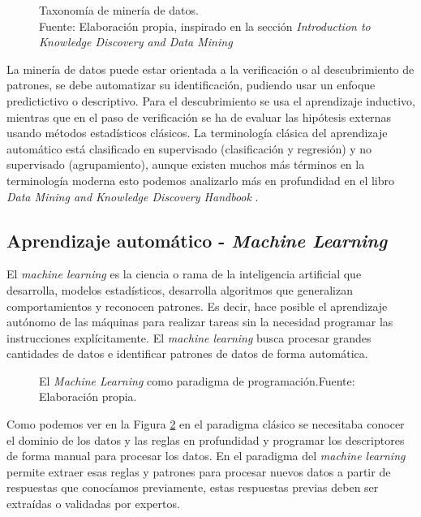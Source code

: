 \begin{figure}[H]
    \centering
    \centerline{}
    \caption{Taxonomía de minería de datos.\\Fuente: Elaboración propia, inspirado en la sección \textit{Introduction to Knowledge Discovery and Data Mining} \cite{maimon2005data}}
    \label{fig:data-mining-taxonomy}
\end{figure}

La minería de datos puede estar orientada a la verificación o al descubrimiento de patrones, se debe automatizar su identificación, pudiendo usar un enfoque predictictivo o descriptivo. Para el descubrimiento se usa el aprendizaje inductivo, mientras que en el paso de verificación se ha de evaluar las hipótesis externas usando métodos estadísticos clásicos. La terminología clásica del aprendizaje automático está clasificado en supervisado (clasificación y regresión) y no supervisado (agrupamiento), aunque existen muchos más términos en la terminología moderna esto podemos analizarlo más en profundidad en el libro \textit{Data Mining and Knowledge Discovery Handbook} \cite{maimon2005data}.


\subsection{Aprendizaje automático - \textit{Machine Learning}}

El \textit{machine learning} es la ciencia o rama de la inteligencia artificial que desarrolla, modelos estadísticos, desarrolla algoritmos que generalizan comportamientos y reconocen patrones. Es decir, hace posible el aprendizaje autónomo de las máquinas para realizar tareas sin la necesidad programar las instrucciones explícitamente. El \textit{machine learning} busca procesar grandes cantidades de datos e identificar patrones de datos de forma automática.

\begin{figure}[H]
    \centering
    \centerline{}
    \caption{El \textit{Machine Learning} como paradigma de programación.\newline{}Fuente: Elaboración propia.}
    \label{fig:machine-learning-rules}
\end{figure}

Como podemos ver en la Figura \ref{fig:machine-learning-rules} en el paradigma clásico se necesitaba conocer el dominio de los datos y las reglas en profundidad y programar los descriptores de forma manual para procesar los datos. En el paradigma del \textit{machine learning} permite extraer esas reglas y patrones para procesar nuevos datos a partir de respuestas que conocíamos previamente, estas respuestas previas deben ser extraídas o validadas por expertos.

